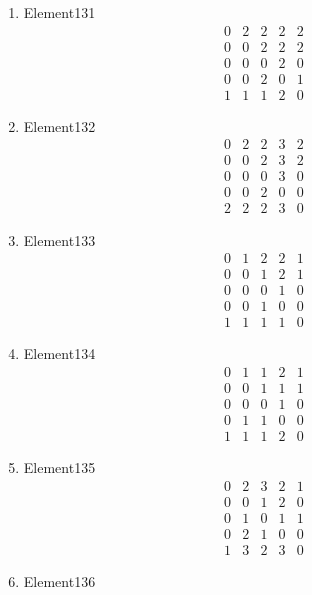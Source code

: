 \documentclass[12pt]{article}
\begin{document}
\begin{multicols}{3}
\begin{enumerate}
\item Element131
\begin{equation*}
\begin{array}{ccccc}
0&2&2&2&2\\
0&0&2&2&2\\
0&0&0&2&0\\
0&0&2&0&1\\
1&1&1&2&0
\end{array}
\end{equation*}
\item Element132
\begin{equation*}
\begin{array}{ccccc}
0&2&2&3&2\\
0&0&2&3&2\\
0&0&0&3&0\\
0&0&2&0&0\\
2&2&2&3&0
\end{array}
\end{equation*}
\item Element133
\begin{equation*}
\begin{array}{ccccc}
0&1&2&2&1\\
0&0&1&2&1\\
0&0&0&1&0\\
0&0&1&0&0\\
1&1&1&1&0
\end{array}
\end{equation*}
\item Element134
\begin{equation*}
\begin{array}{ccccc}
0&1&1&2&1\\
0&0&1&1&1\\
0&0&0&1&0\\
0&1&1&0&0\\
1&1&1&2&0
\end{array}
\end{equation*}
\item Element135
\begin{equation*}
\begin{array}{ccccc}
0&2&3&2&1\\
0&0&1&2&0\\
0&1&0&1&1\\
0&2&1&0&0\\
1&3&2&3&0
\end{array}
\end{equation*}
\item Element136
\begin{equation*}

\end{equation*}
\end{enumerate}
\end{multicols}
\end{document}
